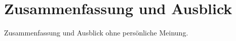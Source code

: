 \clearpage
\section{Zusammenfassung und Ausblick}
\label{sec:5}
Zusammenfassung und Ausblick ohne persönliche Meinung.